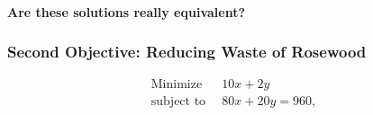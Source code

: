 \paragraph{Are these solutions really equivalent?}
%
\subsubsection{Second Objective: Reducing Waste of Rosewood}
%
\[
\]
\[
\begin{aligned}
\text{Minimize } &\, 10x + 2y \\
\text{subject to } &\, 80x + 20y = 960,\\
\end{aligned}
\]
%
%
